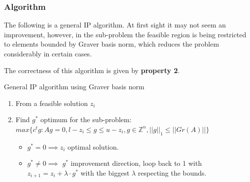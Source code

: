 \documentclass{beamer}
\begin{document}
    \begin{frame}
        \frametitle{Algorithm}
        The following is a general IP algorithm. At first sight it may not seem an improvement, however, in the sub-problem the feasible region is being restricted to elements bounded by Graver basis norm, which reduces the problem considerably in certain cases. 
        
        \vspace{0.5cm}
        The correctness of this algorithm is given by \textbf{property 2}. 
        \vspace{0.5cm}
        \begin{block}{\centering General IP algorithm using Graver basis norm}
        \begin{enumerate}
            \item From a feasible solution $z_i$
            \item Find $g^*$ optimum for the sub-problem: \vspace{4pt}\\
                  $max\{c^tg : Ag = 0, l-z_i \leq g \leq u-z_i, g \in \mathbb{Z}^n, ||g||_1 \leq ||Gr(A)|| \}$ \vspace{4pt}
            \begin{itemize}
                \item $g^* = 0 \implies z_i$ optimal solution.
                \item $g^* \neq 0 \implies$ $g^*$ improvement direction, loop back to 1 with $z_{i+1} = z_i + \lambda \cdot g^*$ with the biggest $\lambda$ respecting the bounds.
            \end{itemize}
        \end{enumerate}
        \end{block}
    \end{frame}
    
\end{document}
